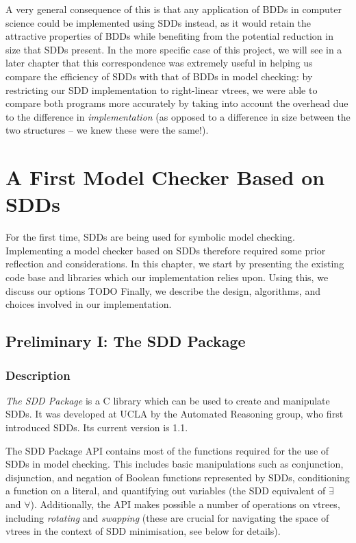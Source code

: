 \documentclass[11pt]{report}
\begin{document}
A very general consequence of this is that any application of BDDs in computer science could be implemented using SDDs instead, as it would retain the attractive properties of BDDs while benefiting from the potential reduction in size that SDDs present. In the more specific case of this project, we will see in a later chapter that this correspondence was extremely useful in helping us compare the efficiency of SDDs with that of BDDs in model checking: by restricting our SDD implementation to right-linear vtrees, we were able to compare both programs more accurately by taking into account the overhead due to the difference in \textit{implementation} (as opposed to a difference in size between the two structures -- we knew these were the same!).

\chapter{A First Model Checker Based on SDDs}

For the first time, SDDs are being used for symbolic model checking. Implementing a model checker based on SDDs therefore required some prior 
reflection and considerations.
In this chapter, we start by presenting the existing code base and libraries which our implementation relies upon. Using this, we discuss our options TODO
Finally, we describe the design, algorithms, and choices involved in our implementation.

\section{Preliminary I: The SDD Package}

\subsection{Description}

\textit{The SDD Package} is a C library which can be used to create and manipulate SDDs. It was developed at UCLA by the Automated Reasoning group, who first introduced SDDs. Its current version is 1.1.  


The SDD Package API contains most of the functions required for the use of SDDs in model checking. This includes basic manipulations such as conjunction, disjunction, and negation of Boolean functions represented by SDDs, conditioning a function on a literal, and quantifying out variables (the SDD equivalent of $\exists$ and $\forall$). Additionally, the API makes possible a number of operations on vtrees, including \textit{rotating }and \textit{swapping} (these are crucial for navigating the space of vtrees in the context of SDD minimisation, see below for details). 
\end{document}
